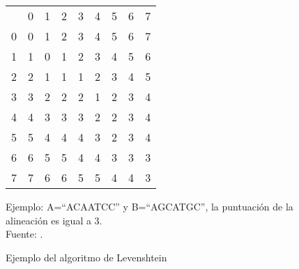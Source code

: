 \begin{figure}[!h]
\centering
\begin{tabular}{ccccccccc}
                       & 0                      & 1                      & 2                      & 3                      & 4                      & 5                      & 6                      & 7                      \\ \cline{2-9}
\multicolumn{1}{c|}{0} & \multicolumn{1}{c|}{0} & \multicolumn{1}{c|}{1} & \multicolumn{1}{c|}{2} & \multicolumn{1}{c|}{3} & \multicolumn{1}{c|}{4} & \multicolumn{1}{c|}{5} & \multicolumn{1}{c|}{6} & \multicolumn{1}{c|}{7} \\ \cline{2-9}
\multicolumn{1}{c|}{1} & \multicolumn{1}{c|}{1} & \multicolumn{1}{c|}{0} & \multicolumn{1}{c|}{1} & \multicolumn{1}{c|}{2} & \multicolumn{1}{c|}{3} & \multicolumn{1}{c|}{4} & \multicolumn{1}{c|}{5} & \multicolumn{1}{c|}{6} \\ \cline{2-9}
\multicolumn{1}{c|}{2} & \multicolumn{1}{c|}{2} & \multicolumn{1}{c|}{1} & \multicolumn{1}{c|}{1} & \multicolumn{1}{c|}{1} & \multicolumn{1}{c|}{2} & \multicolumn{1}{c|}{3} & \multicolumn{1}{c|}{4} & \multicolumn{1}{c|}{5} \\ \cline{2-9}
\multicolumn{1}{c|}{3} & \multicolumn{1}{c|}{3} & \multicolumn{1}{c|}{2} & \multicolumn{1}{c|}{2} & \multicolumn{1}{c|}{2} & \multicolumn{1}{c|}{1} & \multicolumn{1}{c|}{2} & \multicolumn{1}{c|}{3} & \multicolumn{1}{c|}{4} \\ \cline{2-9}
\multicolumn{1}{c|}{4} & \multicolumn{1}{c|}{4} & \multicolumn{1}{c|}{3} & \multicolumn{1}{c|}{3} & \multicolumn{1}{c|}{3} & \multicolumn{1}{c|}{2} & \multicolumn{1}{c|}{2} & \multicolumn{1}{c|}{3} & \multicolumn{1}{c|}{4} \\ \cline{2-9}
\multicolumn{1}{c|}{5} & \multicolumn{1}{c|}{5} & \multicolumn{1}{c|}{4} & \multicolumn{1}{c|}{4} & \multicolumn{1}{c|}{4} & \multicolumn{1}{c|}{3} & \multicolumn{1}{c|}{2} & \multicolumn{1}{c|}{3} & \multicolumn{1}{c|}{4} \\ \cline{2-9}
\multicolumn{1}{c|}{6} & \multicolumn{1}{c|}{6} & \multicolumn{1}{c|}{5} & \multicolumn{1}{c|}{5} & \multicolumn{1}{c|}{4} & \multicolumn{1}{c|}{4} & \multicolumn{1}{c|}{3} & \multicolumn{1}{c|}{3} & \multicolumn{1}{c|}{3} \\ \cline{2-9}
\multicolumn{1}{c|}{7} & \multicolumn{1}{c|}{7} & \multicolumn{1}{c|}{6} & \multicolumn{1}{c|}{6} & \multicolumn{1}{c|}{5} & \multicolumn{1}{c|}{5} & \multicolumn{1}{c|}{4} & \multicolumn{1}{c|}{4} & \multicolumn{1}{c|}{3} \\ \cline{2-9}
\end{tabular}
\caption{Ejemplo del algoritmo de Levenshtein}
Ejemplo: A=``ACAATCC'' y B=``AGCATGC'', la puntuación de la alineación es igual a 3. \\Fuente: \cite{Halim2019}.
\label{tableLev}
\end{figure}
